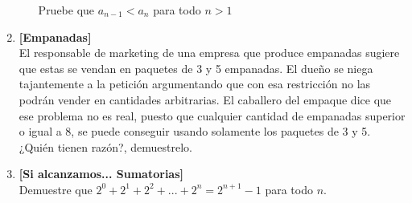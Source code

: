 \documentclass[letterpaper,11pt]{article}
\theoremstyle{plain}
\begin{document}
\begin{enumerate}[\bf P1.]
\begin{enumerate}
            Pruebe que $a_{n-1}<a_n$ para todo $n>1$
        \end{enumerate}
    
    \item \textbf{[Empanadas]}\\
    El responsable de marketing de una empresa que produce empanadas sugiere que estas se vendan en paquetes de 3 y 5 empanadas. El dueño se niega tajantemente a la petición argumentando que con esa restricción no las podrán vender en cantidades arbitrarias. El caballero del empaque dice que ese problema no es real, puesto que cualquier cantidad de empanadas superior o igual a 8, se puede conseguir usando solamente los paquetes de 3 y 5. ¿Quién tienen razón?, demuestrelo.
    
    \item \textbf{[Si alcanzamos... Sumatorias]}\\
        Demuestre que $2^0+2^1+2^2+...+2^n=2^{n+1}-1$ para todo $n$.
    
\end{enumerate}
\end{document}
